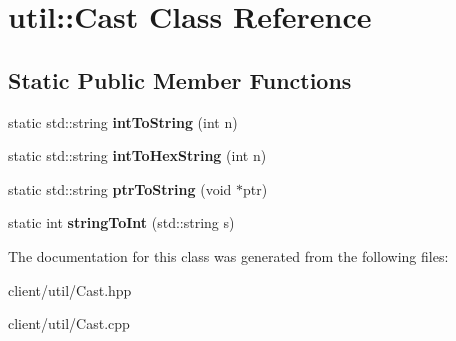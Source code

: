 \hypertarget{classutil_1_1_cast}{\section{util\-:\-:Cast Class Reference}
\label{classutil_1_1_cast}
}
\subsection*{Static Public Member Functions}
\begin{DoxyCompactItemize}
\item 
\hypertarget{classutil_1_1_cast_a853ea6a19a8158df94f05770f5b50d0b}{static std\-::string {\bfseries int\-To\-String} (int n)}\label{classutil_1_1_cast_a853ea6a19a8158df94f05770f5b50d0b}

\item 
\hypertarget{classutil_1_1_cast_a4451fe6524ed8fd9d741bdb908170315}{static std\-::string {\bfseries int\-To\-Hex\-String} (int n)}\label{classutil_1_1_cast_a4451fe6524ed8fd9d741bdb908170315}

\item 
\hypertarget{classutil_1_1_cast_ab7490a99babcb8d23d010b24a5b8cf4a}{static std\-::string {\bfseries ptr\-To\-String} (void $\ast$ptr)}\label{classutil_1_1_cast_ab7490a99babcb8d23d010b24a5b8cf4a}

\item 
\hypertarget{classutil_1_1_cast_ad9e6c139399f25c94ce51ec79c6b6129}{static int {\bfseries string\-To\-Int} (std\-::string s)}\label{classutil_1_1_cast_ad9e6c139399f25c94ce51ec79c6b6129}

\end{DoxyCompactItemize}


The documentation for this class was generated from the following files\-:\begin{DoxyCompactItemize}
\item 
client/util/Cast.\-hpp\item 
client/util/Cast.\-cpp\end{DoxyCompactItemize}
